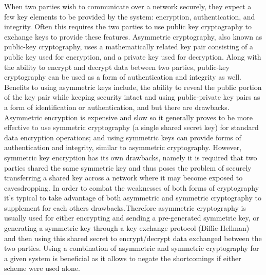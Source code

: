 When two parties  wish to communicate over a network securely, they expect a few key elements to be provided by the system: encryption, authentication, and integrity. Often this requires the two parties to use public key cryptography to exchange keys to provide these features. Asymmetric cryptography, also known as public-key cryptography, uses a mathematically related key pair consisting of a public key used for encryption, and a private key used for decryption. Along with the ability to encrypt and decrypt data between two parties, public-key cryptography can be used as a form of authentication and integrity as well. Benefits to using asymmetric keys include, the ability to reveal the public portion of the key pair while keeping security intact and using public-private key pairs as a form of identification or authentication, and but there are drawbacks. Asymmetric encryption is expensive and slow so it generally proves to be more effective to use symmetric cryptography (a single shared secret key) for standard data encryption operations; and using symmetric keys can provide forms of authentication and integrity, similar to asymmetric cryptography. However, symmetric key encryption has its own drawbacks, namely it is required that two parties shared the same symmetric key and thus poses the problem of securely transferring a shared key across a network where it may become exposed to eavesdropping. In order to combat the weaknesses of both forms of cryptography it's typical to take advantage of both asymmetric and symmetric cryptography to supplement for each others drawbacks.Therefore asymmetric cryptography is usually used for either encrypting and sending a pre-generated symmetric key, or generating a symmetric key through a key exchange protocol (Diffie-Hellman) and then using this shared secret to encrypt/decrypt data exchanged between the two parties. Using a combination of asymmetric and symmetric cryptography for a given system is beneficial as it allows to negate the shortcomings if either scheme were used alone.

